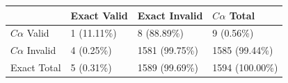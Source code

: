 \begin{tabular}{llll}
\toprule
 & Exact Valid & Exact Invalid & $C\alpha$ Total \\
\midrule
$C\alpha$ Valid & 1 (11.11\%) & 8 (88.89\%) & 9 (0.56\%) \\
$C\alpha$ Invalid & 4 (0.25\%) & 1581 (99.75\%) & 1585 (99.44\%) \\
Exact Total & 5 (0.31\%) & 1589 (99.69\%) & 1594 (100.00\%) \\
\bottomrule
\end{tabular}
